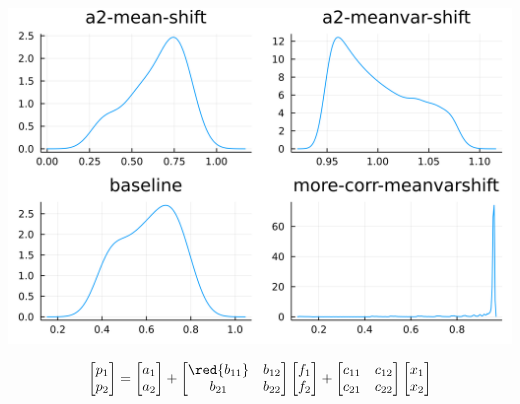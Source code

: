 \documentclass[
  ignorenonframetext,
]{beamer}
\begin{document}
\begin{frame}{}
\protect\hypertarget{section-6}{}
\begin{center}\includegraphics[width=0.95\paperheight]{complexity_files/figure-beamer/unnamed-chunk-28-1} \end{center}

\[
\begin{bmatrix}
 p_1 \\ p_2
\end{bmatrix} =
\begin{bmatrix}
 a_1 \\ {a_2}
\end{bmatrix}
 + 
 \begin{bmatrix}
 \red{b_{11}} & b_{12} \\
 b_{21} & b_{22}
\end{bmatrix}
\begin{bmatrix}
 f_1 \\ f_2
\end{bmatrix}
+
 \begin{bmatrix}
 c_{11} & c_{12} \\
 c_{21} & c_{22}
\end{bmatrix}
\begin{bmatrix}
 x_1 \\ x_2
\end{bmatrix}
\]
\end{frame}
\end{document}
